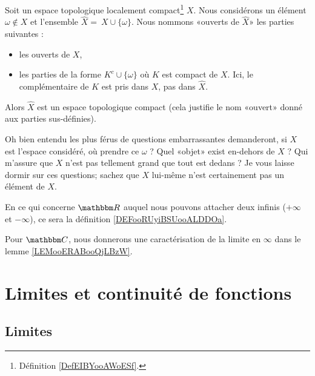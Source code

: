 \begin{propositionDef}       \label{PROPooHNOZooPSzKIN}
    Soit un espace topologique localement compact\footnote{Définition \ref{DefEIBYooAWoESf}.} \( X\). Nous considérons un élément \( \omega\notin X\) et l'ensemble \( \hat X =\ X\cup\{ \omega \}\). Nous nommons «ouverts de \( \hat X\)» les parties suivantes :
    \begin{itemize}
        \item les ouverts de \( X\),
        \item les parties de la forme \( K^c\cup\{ \omega \}\) où \( K\) est compact de \( X\). Ici, le complémentaire de \( K\) est pris dans \( X\), pas dans \( \hat X\).
    \end{itemize}
   Alors \( \hat X\) est un espace topologique compact (cela justifie le nom «ouvert» donné aux parties sus-définies).
\end{propositionDef}

Oh bien entendu les plus férus de questions embarrassantes demanderont, si \( X\) est l'espace considéré, où prendre ce \( \omega\) ? Quel «objet» exist en-dehors de \( X\) ? Qui m'assure que \( X\) n'est pas tellement grand que tout est dedans ? Je vous laisse dormir sur ces questions; sachez que \( X\) lui-même n'est certainement pas un élément de \( X\).

En ce qui concerne \( \eR\) auquel nous pouvons attacher deux infinis (\( +\infty\) et \( -\infty\)), ce sera la définition \ref{DEFooRUyiBSUooALDDOa}.

Pour \( \eC\), nous donnerons une caractérisation de la limite en \( \infty\) dans le lemme \ref{LEMooERABooQjLBzW}.


\section{Limites et continuité de fonctions}

\subsection{Limites}

